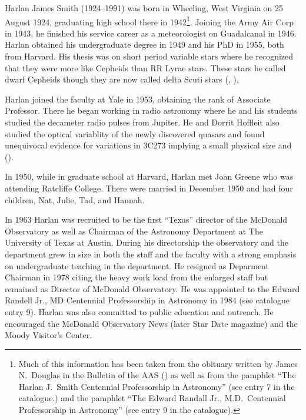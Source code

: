 
Harlan James Smith (1924--1991) was born in Wheeling, West Virginia on
25 August 1924, graduating high school there in 1942\footnote{Much of
this information has been taken from the obituary written by James
N.~Douglas in the Bulletin of the AAS (\cite{Douglas1992Harlan}) as
well as from the pamphlet ``The Harlan J.~Smith Centennial
Professorship in Astronomy'' (see entry 7 in the catalogue.) and the
pamphlet ``The Edward Randall Jr., M.D.~Centennial Professorship in
Astronomy'' (see entry 9 in the catalogue).}. Joining the Army Air
Corp in 1943, he finished his service career as a meteorologist on
Guadalcanal in 1946.  Harlan obtained his undergraduate degree in 1949
and his PhD in 1955, both from Harvard. His thesis was on short period
variable stars where he recognized that they were more like Cepheids
than RR Lyrae stars.  These stars he called dwarf Cepheids though
they are now called delta Scuti stars (\cite{HJS1955}, \cite{HJSPhD}),

Harlan joined the faculty at Yale in 1953, obtaining the rank of
Associate Professor. There he began working in radio astronomy where
he and his students studied the decameter radio pulses from
Jupiter. He and Dorrit Hoffleit also studied the optical variablity of
the newly discovered quasars and found unequivocal evidence for
variations in 3C273 implying a small physical size and
(\cite{HJS1963}).

In 1950, while in graduate school at Harvard, Harlan met Joan Greene
who was attending Ratcliffe College. There were married in December
1950 and had four children, Nat, Julie, Tad, and Hannah.

In 1963 Harlan was recruited to be the first ``Texas'' director of the
McDonald Observatory as well as Chairman of the Astronomy Department
at The University of Texas at Austin. During his directorship the
observatory and the department grew in size in both the staff and the
faculty with a strong emphasis on undergraduate teaching in the
department. He resigned as Deparment Chairman in 1978 citing the
heavy work load from the enlarged staff but remained as Director of
McDonald Observatory. He was appointed to the Edward Randell Jr., MD
Centennial Professorship in Astronomy in 1984 (see catalogue entry 9).
Harlan was also committed to public education and outreach.  He
encouraged the McDonald Observatory News (later Star Date magazine)
and the Moody Visitor's Center.

